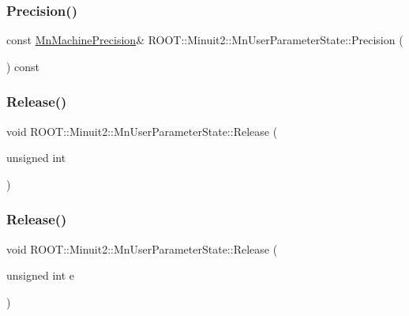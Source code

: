 \subsubsection{\texorpdfstring{Precision()}{Precision()}\hspace{0.1cm}{\footnotesize\ttfamily [3/3]}}
{\footnotesize\ttfamily const \mbox{\hyperlink{classROOT_1_1Minuit2_1_1MnMachinePrecision}{Mn\+Machine\+Precision}}\& R\+O\+O\+T\+::\+Minuit2\+::\+Mn\+User\+Parameter\+State\+::\+Precision (\begin{DoxyParamCaption}{ }\end{DoxyParamCaption}) const}

\mbox{\label{classROOT_1_1Minuit2_1_1MnUserParameterState_a7dd23afe69aaab961b536e2cdc75d66e}} 
\subsubsection{\texorpdfstring{Release()}{Release()}\hspace{0.1cm}{\footnotesize\ttfamily [1/6]}}
{\footnotesize\ttfamily void R\+O\+O\+T\+::\+Minuit2\+::\+Mn\+User\+Parameter\+State\+::\+Release (\begin{DoxyParamCaption}\item[{unsigned int}]{ }\end{DoxyParamCaption})}

\mbox{\label{classROOT_1_1Minuit2_1_1MnUserParameterState_a7dd23afe69aaab961b536e2cdc75d66e}} 
\subsubsection{\texorpdfstring{Release()}{Release()}\hspace{0.1cm}{\footnotesize\ttfamily [2/6]}}
{\footnotesize\ttfamily void R\+O\+O\+T\+::\+Minuit2\+::\+Mn\+User\+Parameter\+State\+::\+Release (\begin{DoxyParamCaption}\item[{unsigned int}]{e }\end{DoxyParamCaption})}

